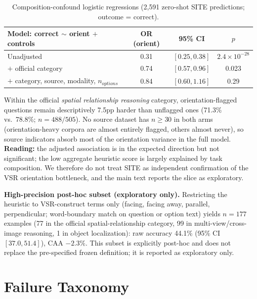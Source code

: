 \begin{table}[h]
\centering
\footnotesize
\caption{Composition-confound logistic regressions (2,591 zero-shot SITE
predictions; outcome = correct).}
\label{tab:confound}
\begin{tabular}{lccc}
\toprule
Model: correct $\sim$ orient $+$ controls & OR (orient) & 95\% CI & $p$ \\
\midrule
Unadjusted & 0.31 & $[0.25, 0.38]$ & $2.4\times10^{-28}$ \\
$+$ official category & 0.74 & $[0.57, 0.96]$ & 0.023 \\
$+$ category, source, modality, $n_{options}$ & 0.84 & $[0.60, 1.16]$ & 0.29 \\
\bottomrule
\end{tabular}
\end{table}

Within the official \emph{spatial relationship reasoning} category,
orientation-flagged questions remain descriptively 7.5pp harder than unflagged
ones (71.3\% vs.\ 78.8\%; $n{=}488/505$). No source dataset has $n{\ge}30$ in
both arms (orientation-heavy corpora are almost entirely flagged, others almost
never), so source indicators absorb most of the orientation variance in the
full model. \textbf{Reading:} the adjusted association is in the expected
direction but not significant; the low aggregate heuristic score is largely
explained by task composition. We therefore do not treat SITE as independent
confirmation of the VSR orientation bottleneck, and the main text reports the
slice as exploratory.

\textbf{High-precision post-hoc subset (exploratory only).} Restricting the
heuristic to VSR-construct terms only (facing, facing away, parallel,
perpendicular; word-boundary match on question or option text) yields
$n{=}177$ examples (77 in the official spatial-relationship category, 99 in
multi-view/cross-image reasoning, 1 in object localization): raw accuracy 44.1\% (95\% CI $[37.0, 51.4]$),
CAA $-2.3\%$. This subset is explicitly post-hoc and does not replace the
pre-specified frozen definition; it is reported as exploratory only.

\section{Failure Taxonomy}
\label{app:taxonomy}

